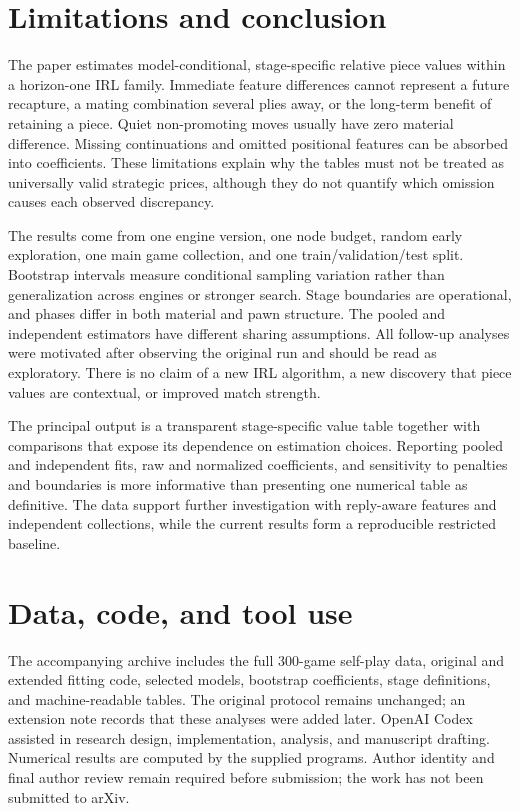 \documentclass[11pt]{article}
\begin{document}
\section{Limitations and conclusion}
The paper estimates model-conditional, stage-specific relative piece values within a horizon-one IRL family. Immediate feature differences cannot represent a future recapture, a mating combination several plies away, or the long-term benefit of retaining a piece. Quiet non-promoting moves usually have zero material difference. Missing continuations and omitted positional features can be absorbed into coefficients. These limitations explain why the tables must not be treated as universally valid strategic prices, although they do not quantify which omission causes each observed discrepancy.

The results come from one engine version, one node budget, random early exploration, one main game collection, and one train/validation/test split. Bootstrap intervals measure conditional sampling variation rather than generalization across engines or stronger search. Stage boundaries are operational, and phases differ in both material and pawn structure. The pooled and independent estimators have different sharing assumptions. All follow-up analyses were motivated after observing the original run and should be read as exploratory. There is no claim of a new IRL algorithm, a new discovery that piece values are contextual, or improved match strength.

The principal output is a transparent stage-specific value table together with comparisons that expose its dependence on estimation choices. Reporting pooled and independent fits, raw and normalized coefficients, and sensitivity to penalties and boundaries is more informative than presenting one numerical table as definitive. The data support further investigation with reply-aware features and independent collections, while the current results form a reproducible restricted baseline.

\section*{Data, code, and tool use}
The accompanying archive includes the full 300-game self-play data, original and extended fitting code, selected models, bootstrap coefficients, stage definitions, and machine-readable tables. The original protocol remains unchanged; an extension note records that these analyses were added later. OpenAI Codex assisted in research design, implementation, analysis, and manuscript drafting. Numerical results are computed by the supplied programs. Author identity and final author review remain required before submission; the work has not been submitted to arXiv.
\end{document}
